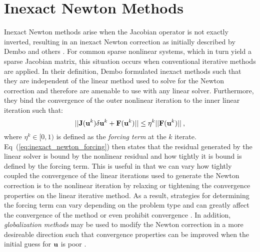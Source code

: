 \section{Inexact Newton Methods}
\label{sec:newton_methods}
Inexact Newton methods arise when the Jacobian operator is not exactly
inverted, resulting in an inexact Newton correction as initially
described by Dembo and others \citep{dembo_inexact_1982}. For common
sparse nonlinear systems, which in turn yield a sparse Jacobian
matrix, this situation occurs when conventional iterative methods are
applied. In their definition, Dembo formulated inexact methods such
that they are independent of the linear method used to solve for the
Newton correction and therefore are amenable to use with any linear
solver. Furthermore, they bind the convergence of the outer nonlinear
iteration to the inner linear iteration such that:
\begin{equation}
  ||\mathbf{J}(\mathbf{u}^k)\delta \mathbf{u}^k + \mathbf{F}(\mathbf{u}^k)|| \leq \eta^k
  ||\mathbf{F}(\mathbf{u}^k)||\:,
  \label{eq:inexact_newton_forcing}
\end{equation}
where $\eta^k \in [0,1)$ is defined as the \textit{forcing term} at
  the $k$ iterate. Eq~(\ref{eq:inexact_newton_forcing}) then states
  that the residual generated by the linear solver is bound by the
  nonlinear residual and how tightly it is bound is defined by the
  forcing term. This is useful in that we can vary how tightly coupled
  the convergence of the linear iterations used to generate the Newton
  correction is to the nonlinear iteration by relaxing or tightening
  the convergence properties on the linear iterative method. As a
  result, strategies for determining the forcing term can vary
  depending on the problem type and can greatly affect the convergence
  of the method or even prohibit convergence
  \citep{eisenstat_choosing_1996}. In addition, \textit{globalization
    methods} may be used to modify the Newton correction in a more
  desireable direction such that convergence properties can be
  improved when the initial guess for $\mathbf{u}$ is poor
  \citep{pawlowski_globalization_2006}.

